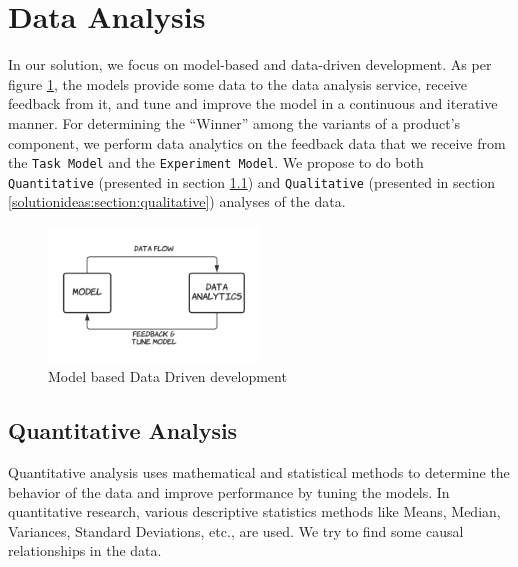 \section{Data Analysis}
\label{solutionideas:section:dataanalysis}

In our solution, we focus on model-based and data-driven development. 
As per figure \ref{solutionideas:fig:dddevelopment}, the models provide some data to the data analysis service, receive feedback from it, and tune and improve the model in a continuous and iterative manner. 
For determining the ``Winner'' among the variants of a product's component, we perform data analytics on the feedback data that we receive from the \texttt{Task Model} and the \texttt{Experiment Model}.
We propose to do both \texttt{Quantitative} (presented in section \ref{solutionideas:section:quantitative}) and \texttt{Qualitative} (presented in section \ref{solutionideas:section:qualitative}) analyses of the data.

\begin{figure}[ht]
	\centering
  \includegraphics[width=0.5\textwidth]{images/solution-ideas/dd-development.png}
	\caption{Model based Data Driven development}
	\label{solutionideas:fig:dddevelopment}
\end{figure}
\subsection{Quantitative Analysis}
\label{solutionideas:section:quantitative}
Quantitative analysis uses mathematical and statistical methods to determine the behavior of the data and improve performance by tuning the models.
In quantitative research, various descriptive statistics methods like Means, Median, Variances, Standard Deviations, etc., are used. 
We try to find some causal relationships in the data. 

